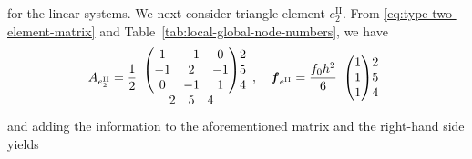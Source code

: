 {for the linear systems. We next consider triangle element $e_2^{\mathrm {II}}$. From \eqref{eq:type-two-element-matrix} and Table\ \ref{tab:local-global-node-numbers}, we have}
\[A_{e_2^{\mathrm {II}}}=\frac12\begin{array}{c@{}c}
\begin{pmatrix}1&-1&0\\-1&2&-1\\0&-1&1\end{pmatrix}&\begin{matrix}2\\5\\4\end{matrix}\\
\begin{matrix}2&5&4\end{matrix}&\end{array},\quad
\boldsymbol{f}_{e^{\mathrm {II}}}=\frac{f_0h^2}{6}\begin{array}{c@{}c}\begin{pmatrix}1\\1\\1\end{pmatrix}&\begin{matrix}2\\5\\4\end{matrix}\end{array}\]
{and adding the information to the aforementioned matrix and the right-hand side yields}
